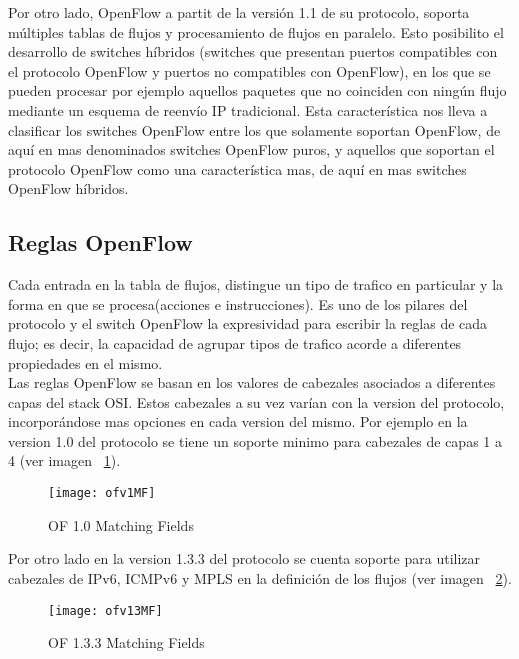 Por otro lado, OpenFlow a partit de la versión 1.1 de su protocolo, soporta múltiples tablas de flujos y procesamiento de flujos en paralelo. Esto posibilito el desarrollo de switches híbridos (switches que presentan puertos compatibles con el protocolo OpenFlow y puertos no compatibles con OpenFlow), en los que se pueden procesar por ejemplo aquellos paquetes que no coinciden con ningún flujo mediante un esquema de reenvío IP tradicional. Esta característica nos lleva a clasificar los switches OpenFlow entre los que solamente soportan OpenFlow, de aquí en mas denominados switches OpenFlow puros, y aquellos que soportan el protocolo OpenFlow como una característica mas, de aquí en mas switches OpenFlow híbridos.

\subsection{Reglas OpenFlow}
Cada entrada en la tabla de flujos, distingue un tipo de trafico en particular y la forma en que se procesa(acciones e instrucciones). Es uno de los pilares del protocolo y el switch OpenFlow la expresividad para escribir la reglas de cada flujo; es decir, la capacidad de agrupar tipos de trafico acorde a diferentes propiedades en el mismo.\\

Las reglas OpenFlow se basan en los valores de cabezales asociados a diferentes capas del stack OSI. Estos cabezales a su vez varían con la version del protocolo, incorporándose mas opciones en cada version del mismo. Por ejemplo en la version 1.0 del protocolo se tiene un soporte minimo para cabezales de capas 1 a 4 (ver imagen ~\ref{fig:OF10MatchingFields}).

\begin{figure}[htbp!] 
\centering    
\texttt{[image: ofv1MF]}
\caption[OF 1.0 Matching Fields]{OF 1.0 Matching Fields}
\label{fig:OF10MatchingFields}
\end{figure}

Por otro lado en la version 1.3.3 del protocolo se cuenta soporte para utilizar cabezales de IPv6, ICMPv6 y MPLS en la definición de los flujos (ver imagen ~\ref{fig:OF13MatchingFields}).
 
\begin{figure}[htbp!] 
\centering    
\texttt{[image: ofv13MF]}
\caption[OF 1.3.3 Matching Fields]{OF 1.3.3 Matching Fields}
\label{fig:OF13MatchingFields}
\end{figure}

